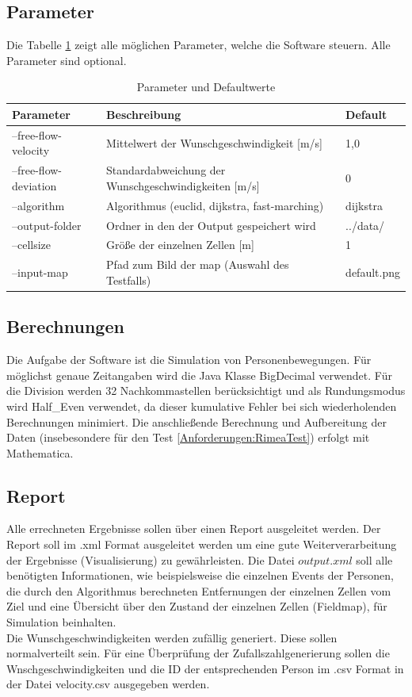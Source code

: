 \subsection{Parameter}
Die Tabelle \ref{tab:parameter} zeigt alle möglichen Parameter, welche die Software steuern. Alle Parameter sind optional.
\begin{table}[htpb]
	\centering
	\begin{tabular}{lll}
		Parameter & Beschreibung  &  Default\\ \hline
		--free-flow-velocity & Mittelwert der Wunschgeschwindigkeit [m/s] & 1,0 \\
		--free-flow-deviation & Standardabweichung der Wunschgeschwindigkeiten [m/s] & 0 \\
		--algorithm & Algorithmus (euclid, dijkstra, fast-marching) & dijkstra \\
		--output-folder & Ordner in den der Output gespeichert wird & ../data/ \\
		--cellsize & Größe der einzelnen Zellen [m] & 1 \\
		--input-map & Pfad zum Bild der map (Auswahl des Testfalls) & default.png \\
		
	\end{tabular}
	\caption{Parameter und Defaultwerte}
	\label{tab:parameter}
\end{table}
	
\subsection{Berechnungen}
Die Aufgabe der Software ist die Simulation von Personenbewegungen. Für möglichst genaue Zeitangaben wird die Java Klasse BigDecimal verwendet. Für die Division werden 32 Nachkommastellen berücksichtigt und als Rundungsmodus wird Half\_Even verwendet, da dieser kumulative Fehler bei sich wiederholenden Berechnungen minimiert. Die anschließende Berechnung und Aufbereitung der Daten (insebesondere für den Test \ref{Anforderungen:RimeaTest}) erfolgt mit Mathematica.

\subsection{Report}
\label{Anforderungen:Report}
Alle errechneten Ergebnisse sollen über einen Report ausgeleitet werden.
Der Report soll im .xml Format ausgeleitet werden um eine gute Weiterverarbeitung der Ergebnisse (Visualisierung) zu gewährleisten. Die Datei $output.xml$ soll alle benötigten Informationen, wie beispielsweise die einzelnen Events der Personen, die durch den Algorithmus berechneten Entfernungen der einzelnen Zellen vom Ziel und eine Übersicht über den Zustand der einzelnen Zellen (Fieldmap), für Simulation beinhalten. \\
Die Wunschgeschwindigkeiten werden zufällig generiert. Diese sollen normalverteilt sein. Für eine Überprüfung der Zufallszahlgenerierung sollen die Wnschgeschwindigkeiten und die ID der entsprechenden Person im .csv Format in der Datei velocity.csv ausgegeben werden.

